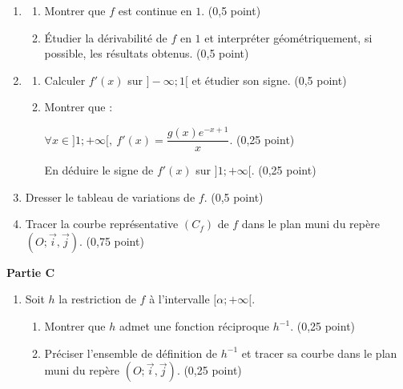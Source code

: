 \documentclass[12pt,a4paper]{article}
\begin{document}
\begin{multicols}{2}
\begin{enumerate}
\begin{enumerate}
\item Déterminer \( \lim_{x\to -\infty} f(x), \quad
\lim_{x\to +\infty} f(x) \)
et interpréter graphiquement, si possible, les résultats obtenus.
\hfill (0,75 point)

\item Étudier la branche infinie de la courbe $(C_f)$ de $f$ en $-\infty$.
\hfill (0,25 point)
\end{enumerate}

\item 
\begin{enumerate}
\item Montrer que $f$ est continue en $1$. \hfill (0,5 point)

\item Étudier la dérivabilité de $f$ en $1$ et interpréter géométriquement, si possible, les résultats obtenus.
\hfill (0,5 point)
\end{enumerate}

\item 
\begin{enumerate}
\item Calculer $f'(x)$ sur $]-\infty;1[$ et étudier son signe.
\hfill (0,5 point)

\item Montrer que :

 \( \forall x\in]1;+\infty[, \ f'(x)=\dfrac{g(x)e^{-x+1}}{x}. \)
\hfill (0,25 point)

En déduire le signe de $f'(x)$ sur $]1;+\infty[$.
\hfill (0,25 point)
\end{enumerate}

\item Dresser le tableau de variations de $f$. \hfill (0,5 point)

\item Tracer la courbe représentative $(C_f)$ de $f$ dans le plan muni du repère $(O;\vec{i},\vec{j})$.
\hfill (0,75 point)
\end{enumerate}

\textbf{Partie C}

\begin{enumerate}
\item Soit $h$ la restriction de $f$ à l’intervalle $[\alpha;+\infty[$.
\begin{enumerate}
\item Montrer que $h$ admet une fonction réciproque $h^{-1}$. \hfill (0,25 point)

\item Préciser l’ensemble de définition de $h^{-1}$ et tracer sa courbe dans le plan muni du repère $(O;\vec{i},\vec{j})$.
\hfill (0,25 point)
\end{enumerate}


\end{enumerate}
\end{multicols}
\end{document}

